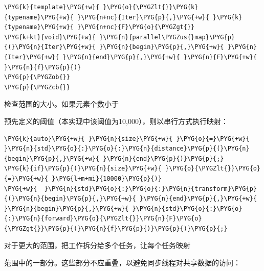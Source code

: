 \begin{codeblockbg}
\begin{Verbatim}[commandchars=\\\{\},breaklines=true,breakanywhere=true,fontsize=\codefont,xleftmargin=17bp]
\PYG{k}{template}\PYG{+w}{ }\PYG{o}{\PYGZlt{}}\PYG{k}{typename}\PYG{+w}{ }\PYG{n+nc}{Iter}\PYG{p}{,}\PYG{+w}{ }\PYG{k}{typename}\PYG{+w}{ }\PYG{n+nc}{F}\PYG{o}{\PYGZgt{}}
\PYG{k+kt}{void}\PYG{+w}{ }\PYG{n}{parallel\PYGZus{}map}\PYG{p}{(}\PYG{n}{Iter}\PYG{+w}{ }\PYG{n}{begin}\PYG{p}{,}\PYG{+w}{ }\PYG{n}{Iter}\PYG{+w}{ }\PYG{n}{end}\PYG{p}{,}\PYG{+w}{ }\PYG{n}{F}\PYG{+w}{ }\PYG{n}{f}\PYG{p}{)}
\PYG{p}{\PYGZob{}}
\PYG{p}{\PYGZcb{}}
\end{Verbatim}
\end{codeblockbg}



检查范围的大小。如果元素个数小于



预先定义的阈值（本实现中该阈值为10,000），则以串行方式执行映射：



\begin{codeblockbg}
\begin{Verbatim}[commandchars=\\\{\},breaklines=true,breakanywhere=true,fontsize=\codefont,xleftmargin=17bp]
\PYG{k}{auto}\PYG{+w}{ }\PYG{n}{size}\PYG{+w}{ }\PYG{o}{=}\PYG{+w}{ }\PYG{n}{std}\PYG{o}{:}\PYG{o}{:}\PYG{n}{distance}\PYG{p}{(}\PYG{n}{begin}\PYG{p}{,}\PYG{+w}{ }\PYG{n}{end}\PYG{p}{)}\PYG{p}{;}
\PYG{k}{if}\PYG{p}{(}\PYG{n}{size}\PYG{+w}{ }\PYG{o}{\PYGZlt{}}\PYG{o}{=}\PYG{+w}{ }\PYG{l+m+mi}{10000}\PYG{p}{)}
\PYG{+w}{  }\PYG{n}{std}\PYG{o}{:}\PYG{o}{:}\PYG{n}{transform}\PYG{p}{(}\PYG{n}{begin}\PYG{p}{,}\PYG{+w}{ }\PYG{n}{end}\PYG{p}{,}\PYG{+w}{ }\PYG{n}{begin}\PYG{p}{,}\PYG{+w}{ }\PYG{n}{std}\PYG{o}{:}\PYG{o}{:}\PYG{n}{forward}\PYG{o}{\PYGZlt{}}\PYG{n}{F}\PYG{o}{\PYGZgt{}}\PYG{p}{(}\PYG{n}{f}\PYG{p}{)}\PYG{p}{)}\PYG{p}{;}
\end{Verbatim}
\end{codeblockbg}



对于更大的范围，把工作拆分给多个任务，让每个任务映射



范围中的一部分。这些部分不应重叠，以避免同步线程对共享数据的访问：



